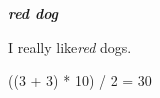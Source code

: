 \documentclass[11pt]{article}
\begin{document}
\textbf{\textit{red dog}}

I really like\textit{red} dogs.

((3 + 3) * 10) / 2 = 30
\end{document}

